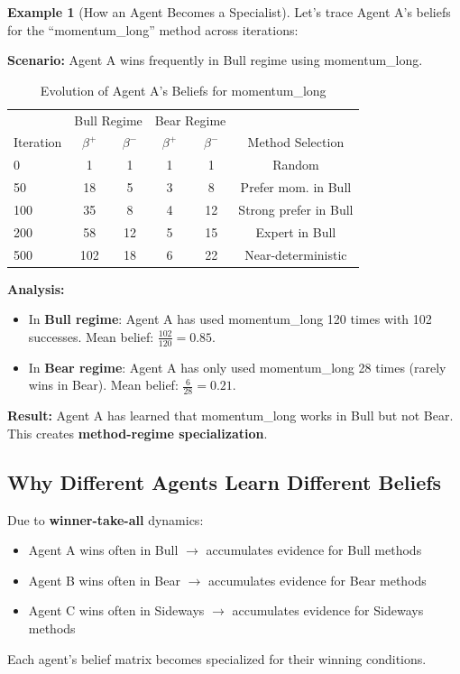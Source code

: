 \documentclass[11pt,a4paper]{article}
\theoremstyle{definition}
\newtheorem{example}{Example}[section]
\theoremstyle{plain}
\begin{document}
\begin{example}[How an Agent Becomes a Specialist]
Let's trace Agent A's beliefs for the ``momentum\_long'' method across iterations:

\textbf{Scenario:} Agent A wins frequently in Bull regime using momentum\_long.

\begin{table}[h]
\centering
\caption{Evolution of Agent A's Beliefs for momentum\_long}
\begin{tabular}{l|cc|cc|c}
\toprule
& \multicolumn{2}{c|}{Bull Regime} & \multicolumn{2}{c|}{Bear Regime} & \\
Iteration & $\beta^+$ & $\beta^-$ & $\beta^+$ & $\beta^-$ & Method Selection \\
\midrule
0 & 1 & 1 & 1 & 1 & Random \\
50 & 18 & 5 & 3 & 8 & Prefer mom. in Bull \\
100 & 35 & 8 & 4 & 12 & Strong prefer in Bull \\
200 & 58 & 12 & 5 & 15 & Expert in Bull \\
500 & 102 & 18 & 6 & 22 & Near-deterministic \\
\bottomrule
\end{tabular}
\end{table}

\textbf{Analysis:}
\begin{itemize}
    \item In \textbf{Bull regime}: Agent A has used momentum\_long 120 times with 102 successes. Mean belief: $\frac{102}{120} = 0.85$.
    \item In \textbf{Bear regime}: Agent A has only used momentum\_long 28 times (rarely wins in Bear). Mean belief: $\frac{6}{28} = 0.21$.
\end{itemize}

\textbf{Result:} Agent A has learned that momentum\_long works in Bull but not Bear. This creates \textbf{method-regime specialization}.
\end{example}

\subsection{Why Different Agents Learn Different Beliefs}

\begin{keypoint}
Due to \textbf{winner-take-all} dynamics:
\begin{itemize}
    \item Agent A wins often in Bull $\rightarrow$ accumulates evidence for Bull methods
    \item Agent B wins often in Bear $\rightarrow$ accumulates evidence for Bear methods
    \item Agent C wins often in Sideways $\rightarrow$ accumulates evidence for Sideways methods
\end{itemize}
Each agent's belief matrix becomes specialized for their winning conditions.
\end{keypoint}
\end{document}
